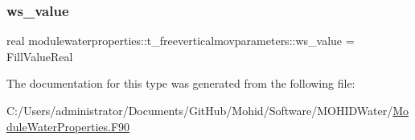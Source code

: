 \subsubsection{\texorpdfstring{ws\+\_\+value}{ws\_value}}
{\footnotesize\ttfamily real modulewaterproperties\+::t\+\_\+freeverticalmovparameters\+::ws\+\_\+value = Fill\+Value\+Real\hspace{0.3cm}{\ttfamily [private]}}



The documentation for this type was generated from the following file\+:\begin{DoxyCompactItemize}
\item 
C\+:/\+Users/administrator/\+Documents/\+Git\+Hub/\+Mohid/\+Software/\+M\+O\+H\+I\+D\+Water/\mbox{\hyperlink{_module_water_properties_8_f90}{Module\+Water\+Properties.\+F90}}\end{DoxyCompactItemize}
